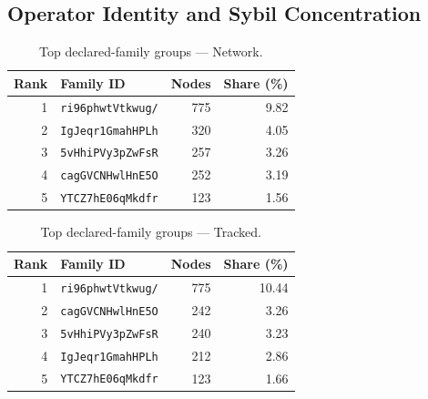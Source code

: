 \documentclass[conference]{IEEEtran}
\begin{document}
\FloatBarrier
\subsection{Operator Identity and Sybil Concentration}
\FloatBarrier

\begin{table}[H]
\caption{Top declared-family groups --- Network.}
\begin{center}\small
\begin{tabular}{|r|l|r|r|}
\hline
\textbf{Rank} & \textbf{Family ID} & \textbf{Nodes} & \textbf{Share (\%)} \\ \hline
1 & \texttt{ri96phwtVtkwug/} & 775 & 9.82 \\ \hline
2 & \texttt{IgJeqr1GmahHPLh} & 320 & 4.05 \\ \hline
3 & \texttt{5vHhiPVy3pZwFsR} & 257 & 3.26 \\ \hline
4 & \texttt{cagGVCNHwlHnE5O} & 252 & 3.19 \\ \hline
5 & \texttt{YTCZ7hE06qMkdfr} & 123 & 1.56 \\ \hline
\end{tabular}
\label{tab:famid_count_network}
\end{center}\end{table}
 
\begin{table}[H]
\caption{Top declared-family groups --- Tracked.}
\begin{center}\small
\begin{tabular}{|r|l|r|r|}
\hline
\textbf{Rank} & \textbf{Family ID} & \textbf{Nodes} & \textbf{Share (\%)} \\ \hline
1 & \texttt{ri96phwtVtkwug/} & 775 & 10.44 \\ \hline
2 & \texttt{cagGVCNHwlHnE5O} & 242 & 3.26 \\ \hline
3 & \texttt{5vHhiPVy3pZwFsR} & 240 & 3.23 \\ \hline
4 & \texttt{IgJeqr1GmahHPLh} & 212 & 2.86 \\ \hline
5 & \texttt{YTCZ7hE06qMkdfr} & 123 & 1.66 \\ \hline
\end{tabular}
\label{tab:famid_count_tracked}
\end{center}\end{table}
 
\end{document}
